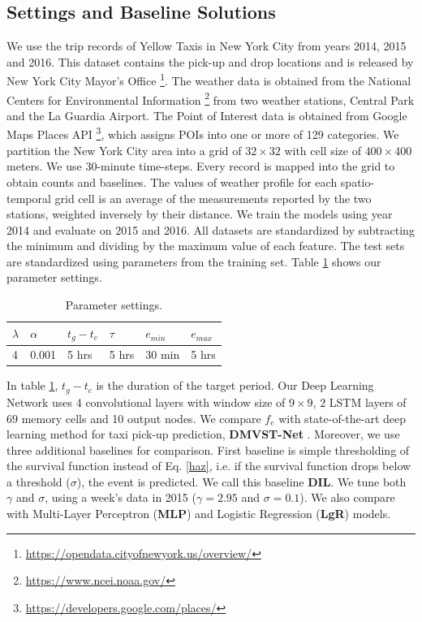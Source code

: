 \documentclass[letterpaper]{article} %
\begin{document}
\subsection{Settings and Baseline Solutions}
\label{settings}
We use the trip records of Yellow Taxis in New York City from years 2014, 2015 and 2016. This dataset contains the pick-up and drop locations and is released by New York City Mayor's Office \footnote{\tiny\url{https://opendata.cityofnewyork.us/overview/}}. The weather data is obtained from the National Centers for Environmental Information \footnote{\tiny\url{https://www.ncei.noaa.gov/}} from two weather stations, Central Park and the La Guardia Airport. The Point of Interest data is obtained from Google Maps Places API \footnote{\tiny\url{https://developers.google.com/places/}}, which assigns POIs into one or more of 129 categories. We partition the New York City area into a grid of $32\times32$ with cell size of $400\times400$ meters. We use 30-minute time-steps. Every record is mapped into the grid to obtain counts and baselines. The values of weather profile for each spatio-temporal grid cell is an average of the measurements reported by the two stations, weighted inversely by their distance. We train the models using year 2014 and evaluate on 2015 and 2016. All datasets are standardized by subtracting the minimum and dividing by the maximum value of each feature. The test sets are standardized using parameters from the training set. Table \ref{params} shows our parameter settings.

\begin{table}
	\small
	\centering
	\caption{\small Parameter settings.}
	\label{params}
	\begin{tabular}{llllll}
		\toprule
		$\lambda$ & $\alpha$ & $t_g-t_c$ & $\tau$ & $e_{min}$ & $e_{max}$\\
		\midrule
		4 & 0.001 & 5 hrs & 5 hrs & 30 min & 5 hrs \\
		\bottomrule
	\end{tabular}
\end{table}

In table \ref{params}, $t_g-t_c$ is the duration of the target period. Our Deep Learning Network uses 4 convolutional layers with window size of $9\times 9$, $2$ LSTM layers of $69$ memory cells and 10 output nodes. We compare $f_e$ with state-of-the-art deep learning method for taxi pick-up prediction, \textbf{DMVST-Net} \cite{yao2018deep}. Moreover, we use three additional baselines for comparison. First baseline is simple thresholding of the survival function instead of Eq. \ref{haz}, i.e. if the survival function drops below a threshold ($\sigma$), the event is predicted. We call this baseline \textbf{DIL}. We tune both $\gamma$ and $\sigma$, using a week's data in 2015 ($\gamma=2.95$ and $\sigma=0.1$). We also compare with Multi-Layer Perceptron (\textbf{MLP}) and Logistic Regression (\textbf{LgR}) models.
\end{document}

